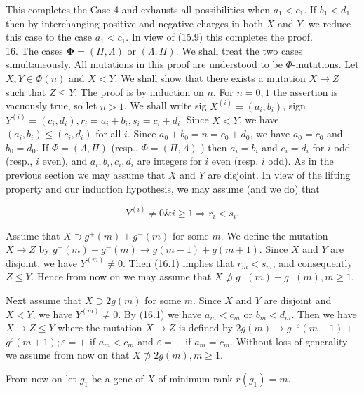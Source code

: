 \documentclass[10pt]{article}
\begin{document}
This completes the Case 4 and exhausts all possibilities when $a_{1}<c_{1}$. If $b_{1}<d_{1}$ then by interchanging positive and negative charges in both $X$ and $Y$, we reduce this case to the case $a_{1}<c_{1}$. In view of (15.9) this completes the proof.\\
16. The cases $\boldsymbol{\Phi}=(\Pi, \Lambda)$ or $(\Lambda, \Pi)$. We shall treat the two cases simultaneously. All mutations in this proof are understood to be $\Phi$-mutations. Let $X, Y \in \Phi(n)$ and $X<Y$. We shall show that there exists a mutation $X \rightarrow Z$ such that $Z \leqslant Y$. The proof is by induction on $n$. For $n=0,1$ the assertion is vacuously true, so let $n>1$. We shall write sig $X^{(i)}=\left(a_{i}, b_{i}\right)$, sign $Y^{(i)}=\left(c_{i}, d_{i}\right), r_{i}=a_{i}+b_{i}, s_{i}=c_{i}+d_{i}$. Since $X<Y$, we have $\left(a_{i}, b_{i}\right) \leqslant\left(c_{i}, d_{i}\right)$ for all $i$. Since $a_{0}+b_{0}=n=c_{0}+d_{0}$, we have $a_{0}=c_{0}$ and $b_{0}=d_{0}$. If $\Phi=(\Lambda, \Pi)$ (resp., $\Phi=(\Pi, \Lambda)$ ) then $a_{i}=b_{i}$ and $c_{i}=d_{i}$ for $i$ odd (resp., $i$ even), and $a_{i}, b_{i}, c_{i}, d_{i}$ are integers for $i$ even (resp. $i$ odd). As in the previous section we may assume that $X$ and $Y$ are disjoint. In view of the lifting property and our induction hypothesis, we may assume (and we do) that


\begin{equation*}
Y^{(i)} \neq 0 \& i \geqslant 1 \Rightarrow r_{i}<s_{i} . \tag{16.1}
\end{equation*}


Assume that $X \supset g^{+}(m)+g^{-}(m)$ for some $m$. We define the mutation $X \rightarrow Z$ by $g^{+}(m)+g^{-}(m) \rightarrow g(m-1)+g(m+1)$. Since $X$ and $Y$ are disjoint, we have $Y^{(m)} \neq 0$. Then (16.1) implies that $r_{m}<s_{m}$, and consequently $Z \leqslant Y$. Hence from now on we may assume that $X \not \supset g^{+}(m)+g^{-}(m), m \geqslant 1$.

Next assume that $X \supset 2 g(m)$ for some $m$. Since $X$ and $Y$ are disjoint and $X<Y$, we have $Y^{(m)} \neq 0$. By (16.1) we have $a_{m}<c_{m}$ or $b_{m}<d_{m}$. Then we have $X \rightarrow Z \leqslant Y$ where the mutation $X \rightarrow Z$ is defined by $2 g(m) \rightarrow g^{-\varepsilon}(m-1)+$ $g^{\varepsilon}(m+1) ; \varepsilon=+$ if $a_{m}<c_{m}$ and $\varepsilon=-$ if $a_{m}=c_{m}$. Without loss of generality we assume from now on that $X \not \supset 2 g(m), m \geqslant 1$.

From now on let $g_{1}$ be a gene of $X$ of minimum rank $r\left(g_{1}\right)=m$.
\end{document}
